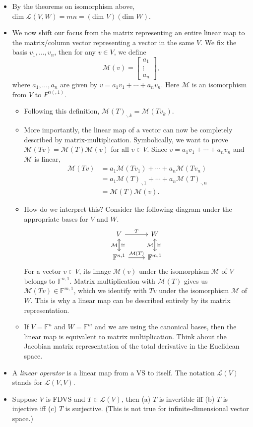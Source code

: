 \documentclass{article}
\newcommand{\F}{\mathbb{F}}
\newcommand{\LV}{\mathcal{L}(V)}
\newcommand{\LVW}{\mathcal{L}(V,W)}
\newcommand{\M}{\mathcal{M}}
\newcommand{\bv}{v_1,\dots,v_n}
\renewcommand{\d}{\text{dim }}
\begin{document}
\begin{itemize}
    \item By the theorems on isomorphism above, $\d \LVW = mn = (\d V) (\d W)$.
    \item We now shift our focus from the matrix representing an entire linear map to the matrix/column vector representing a vector in the same $V$. We fix the basis $\bv$, then for any $v \in V$, we define
    \begin{equation*}
        \M(v) = 
        \begin{bmatrix}
            a_1 \\ \vdots \\ a_n
        \end{bmatrix},
    \end{equation*}
    where $a_1,\dots,a_n$ are given by $v = a_1v_1+\cdots+a_nv_n$. Here $\M$ is an isomorphism from $V$ to $F^{n(, 1)}$.
    \begin{itemize}
        \item Following this definition, $\M(T)_{\cdot,k} = \M(Tv_k)$.
        \item More importantly, the linear map of a vector can now be completely described by matrix-multiplication. Symbolically, we want to prove $\M(Tv) = \M(T)\M(v)$ for all $v \in V$. Since $v = a_1v_1 + \cdots +a_nv_n$ and $\M$ is linear,
        \begin{align*}
            \M(Tv) & = a_1\M(Tv_1) + \cdots + a_n \M(Tv_n) \\ & = a_1\M(T)_{\cdot, 1} + \cdots + a_n\M(T)_{\cdot, n} \\ & = \M(T)\M(v).
        \end{align*}
        \item How do we interpret this? Consider the following diagram under the appropriate bases for $V$ and $W$.
        \begin{equation*}
            \begin{tikzcd}
            V \arrow[r,"T"] \arrow[d,"\simeq"]& W \arrow[d,"\simeq"] \\
            \F^{n,1} \arrow[r,"\M(T)"] \arrow[u,"\M"] & \F^{m,1} \arrow[u,"\M"]
            \end{tikzcd}
        \end{equation*}
        For a vector $v \in V$, its image $\M(v)$ under the isomorphism $\M$ of $V$ belongs to $\F^{n,1}$. Matrix multiplication with $\M(T)$ gives us $\M(Tv) \in \F^{m,1}$, which we identify with $Tv$ under the isomorphism $\M$ of $W$. This is why a linear map can be described entirely by its matrix representation.
        \item If $V = \F^n$ and $W = \F^m$ and we are using the canonical bases, then the linear map is equivalent to matrix multiplication. Think about the Jacobian matrix representation of the total derivative in the Euclidean space.
    \end{itemize}
    \item A \textit{linear operator} is a linear map from a VS to itself. The notation $\LV$ stands for $\mathcal{L}(V,V)$.
    \item Suppose $V$ is FDVS and $T \in \LV$, then (a) $T$ is invertible iff (b) $T$ is injective iff (c) $T$ is surjective. (This is not true for infinite-dimensional vector space.)
        

\end{itemize}
\end{document}

